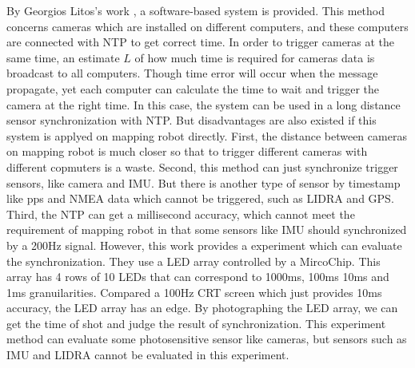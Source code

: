 \documentclass[conference]{IEEEtran}
\begin{document}
	By Georgios Litos's work \cite{Litos2006Synchronous}, a software-based system is provided. This method concerns cameras which are installed on different computers, and these computers are connected with NTP to get correct time. In order to trigger cameras at the same time, an estimate $L$ of how much time is required for cameras data is broadcast to all computers. Though time error will occur when the message propagate, yet each computer can calculate the time to wait and trigger the camera at the right time. In this case, the system can be used in a long distance sensor synchronization with NTP. But disadvantages are also existed if this system is applyed on mapping robot directly. First, the distance between cameras on mapping robot is much closer so that to trigger different cameras with different copmuters is a waste. Second, this method can just synchronize trigger sensors, like camera and IMU. But there is another type of sensor by timestamp like pps and NMEA data which cannot be triggered, such as LIDRA and GPS. Third, the NTP can get a millisecond accuracy, which cannot meet the requirement of mapping robot in that some sensors like IMU should synchronized by a 200Hz signal. However, this work \cite{Litos2006Synchronous} provides a experiment which can evaluate the synchronization. They use a LED array controlled by a MircoChip. This array has 4 rows of 10 LEDs that can correspond to 1000ms, 100ms 10ms and 1ms granuilarities. Compared a 100Hz CRT screen which just provides 10ms accuracy, the LED array has an edge. By photographing the LED array, we can get the time of shot and judge the result of synchronization. This experiment method can evaluate some photosensitive sensor like cameras, but sensors such as IMU and LIDRA cannot be evaluated in this experiment.
	\par
\end{document}
